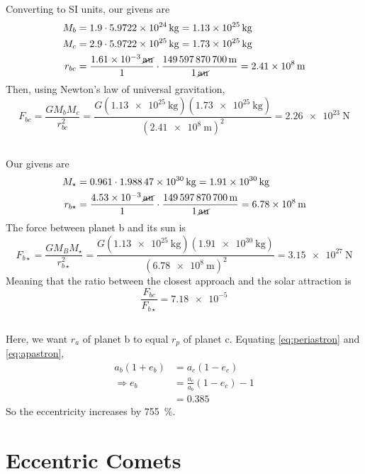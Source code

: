 \documentclass{article}
\begin{document}
Converting to SI units, our givens are
\begin{align}
    M_b &= 1.9 \cdot \SI{5.9722e+24}{\kilogram} = \SI{1.13e+25}{\kilogram} \\
    M_c &= 2.9 \cdot \SI{5.9722e+25}{\kilogram} = \SI{1.73e+25}{\kilogram} \\
    r_{bc} &= \frac{\SI{1.61e-3}{\cancel\astronomicalunit}}{1} \cdot \frac{\SI{149597870700}{\meter}}{\SI{1}{\cancel\astronomicalunit}} = \SI{2.41e+8}{\meter}
\end{align}
Then, using Newton's law of universal gravitation,
\begin{equation}
    F_{bc} = \frac{G M_b M_c}{r_{bc}^2} = \frac{G (\SI{1.13e+25}{\kilogram}) (\SI{1.73e+25}{\kilogram})}{(\SI{2.41e+8}{\meter})^2} = \SI{2.26e+23}{\newton}
\end{equation}

\subsection{}

Our givens are
\begin{align}
    M_\star &= 0.961 \cdot \SI{1.98847e+30}{\kilogram} = \SI{1.91e+30}{\kilogram}\\
    r_{b\star} &= \frac{\SI{4.53e-3}{\cancel\astronomicalunit}}{1} \cdot \frac{\SI{149597870700}{\meter}}{\SI{1}{\cancel\astronomicalunit}} = \SI{6.78e+8}{\meter}
\end{align}
The force between planet b and its sun is
\begin{equation}
    F_{b\star} = \frac{G M_B M_\star}{r_{b\star}^2} = \frac{G (\SI{1.13e+25}{\kilogram}) (\SI{1.91e+30}{\kilogram})}{(\SI{6.78e+8}{\meter})^2} = \SI{3.15e+27}{\newton}
\end{equation}
Meaning that the ratio between the closest approach and the solar attraction is
\begin{equation}
    \frac{F_{bc}}{F_{b\star}} = \num{7.18e-5}
\end{equation}

\subsection{}

Here, we want \(r_a\) of planet b to equal \(r_p\) of planet c.
Equating \autoref{eq:periastron} and \autoref{eq:apastron},
\begin{align}
    a_b (1 + e_b) &= a_c (1 - e_c) \\
    \Rightarrow e_b &= \frac{a_c}{a_b} (1 - e_c) - 1 \\
    &= 0.385
\end{align}
So the eccentricity increases by \SI{755}{\percent}.

\section{Eccentric Comets}
\end{document}
